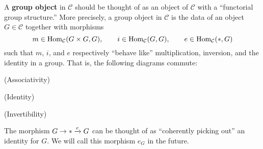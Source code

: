 \documentclass[11pt]{article}
\renewcommand{\C}{\mathcal{C}}
\begin{document}
A \textbf{group object} in $\C$ should be thought of as an object of $\C$ with a ``functorial group structure.'' More precisely, a group object in $\C$ is the data of an object $G\in\C$ together with morphisms 
$$m\in\Hom_{\C}(G\times G,G),\qquad i\in\Hom_{\C}(G,G),\qquad e\in\Hom_{\C}(*,G)$$ 
such that $m$, $i$, and $e$ respectively ``behave like'' multiplication, inversion, and the identity in a group. That is, the following diagrams commute:
\begin{enum}{\roman}
\item[] (Associativity)

\begin{center}
\end{center}

\item[] (Identity)

\begin{center}
\end{center}

\item[] (Invertibility)

\begin{center}
\end{center}
\end{enum}

\begin{remark}
The morphism $G\to*\xrightarrow{e}G$ can be thought of as ``coherently picking out'' an identity for $G$. We will call this morphism $e_G$ in the future.
\end{remark}
\end{document}

